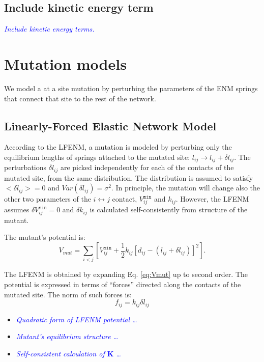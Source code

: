 \documentclass[12pt]{article}
\newcommand{\todo}[1]{\emph{\textcolor{blue} {#1}}}
\newcommand{\lij}{l_{ij}}
\newcommand{\kij}{k_{ij}}
\newcommand{\vijMin}{V^{\mathtt{min}}_{ij}}
\newcommand{\kmat}{\mathbf{K}}
\newcommand{\dlij}{\delta \lij}
\begin{document}
\subsection{Include kinetic energy term}
\todo{Include kinetic energy terms.}



\section{Mutation models}

We model a at a site mutation by perturbing the parameters of the ENM springs that connect that site to the rest of the network. 

\subsection{Linearly-Forced Elastic Network Model}

According to the LFENM, a mutation is modeled by perturbing only the equilibrium lengths of springs attached to the mutated site: $\lij \to \lij + \dlij$.  The perturbations $\dlij$ are picked independently for each of the contacts of the mutated site, from the same distribution. The distribution is assumed to  satisfy $<\dlij> = 0$ and $Var(\dlij) = \sigma^2$. In principle, the mutation will change also the other two parameters of the $i \leftrightarrow j$ contact, $\vijMin$ and $\kij$. However, the LFENM assumes $\delta \vijMin = 0$ and $\delta  \kij$ is  calculated self-consistently from structure of the mutant.

The mutant's potential is:
\begin{equation} \label{eq:Vmut}
V_{mut} =  \sum_{i<j} \left[
	\vijMin + \frac{1}{2} k_{ij} [d_{ij}-(\lij+\dlij)]^2
    \right].
\end{equation}

The LFENM is obtained by expanding Eq. \ref{eq:Vmut} up to second order. The potential is expressed in terms of ``forces'' directed along the contacts of the mutated site. The norm of such forces is:
\begin{equation} \label{eq:fij}
f_{ij} = k_{ij} \dlij
\end{equation}


\begin{itemize}
\item \todo{Quadratic form of LFENM potential \ldots }

\item \todo{Mutant's equilibrium structure \ldots}


\item \todo{Self-consistent calculation of $\kmat$ \ldots}


\end{itemize}
\end{document}
